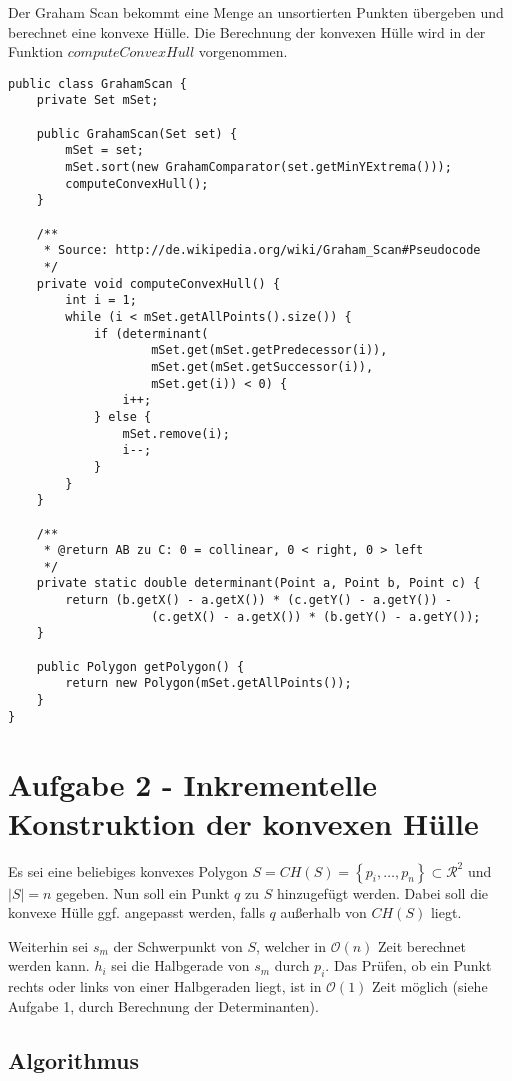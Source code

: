\documentclass[a4paper]{article}
\begin{document}
Der Graham Scan bekommt eine Menge an unsortierten Punkten übergeben und berechnet eine konvexe Hülle. Die Berechnung der konvexen Hülle wird in der Funktion $computeConvexHull$ vorgenommen.

\begin{lstlisting}
public class GrahamScan {
    private Set mSet;

    public GrahamScan(Set set) {
        mSet = set;
        mSet.sort(new GrahamComparator(set.getMinYExtrema()));
        computeConvexHull();
    }

    /**
     * Source: http://de.wikipedia.org/wiki/Graham_Scan#Pseudocode
     */
    private void computeConvexHull() {
        int i = 1;
        while (i < mSet.getAllPoints().size()) {
            if (determinant(
                    mSet.get(mSet.getPredecessor(i)),
                    mSet.get(mSet.getSuccessor(i)),
                    mSet.get(i)) < 0) {
                i++;
            } else {
                mSet.remove(i);
                i--;
            }
        }
    }

    /**
     * @return AB zu C: 0 = collinear, 0 < right, 0 > left
     */
    private static double determinant(Point a, Point b, Point c) {
        return (b.getX() - a.getX()) * (c.getY() - a.getY()) -
                    (c.getX() - a.getX()) * (b.getY() - a.getY());
    }

    public Polygon getPolygon() {
        return new Polygon(mSet.getAllPoints());
    }
}
\end{lstlisting}


\section*{Aufgabe 2 - Inkrementelle Konstruktion der konvexen Hülle}

Es sei eine beliebiges konvexes Polygon $S = CH(S) = \left\{p_i, \dots, p_n\right\} \subset \mathcal{R}^2$ und $|S| = n$ gegeben. Nun soll ein Punkt $q$ zu $S$ hinzugefügt werden. Dabei soll die konvexe Hülle ggf. angepasst werden, falls $q$ außerhalb von $CH(S)$ liegt. 

Weiterhin sei $s_m$ der Schwerpunkt von $S$, welcher in $\mathcal{O}(n)$ Zeit berechnet werden kann. $h_i$ sei die Halbgerade von $s_m$ durch $p_i$. Das Prüfen, ob ein Punkt rechts oder links von einer Halbgeraden liegt, ist in $\mathcal{O}(1)$ Zeit möglich (siehe Aufgabe 1, durch Berechnung der Determinanten).

\subsection*{Algorithmus}
\end{document}
